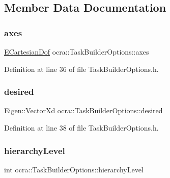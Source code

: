 \subsection{Member Data Documentation}
\hypertarget{classocra_1_1TaskBuilderOptions_ad29bb1310906e4618c8132dd3cea771c}{}\label{classocra_1_1TaskBuilderOptions_ad29bb1310906e4618c8132dd3cea771c} 
\subsubsection{\texorpdfstring{axes}{axes}}
{\footnotesize\ttfamily \hyperlink{namespaceocra_a436781c7059a0f76027df1c652126260}{E\+Cartesian\+Dof} ocra\+::\+Task\+Builder\+Options\+::axes}



Definition at line 36 of file Task\+Builder\+Options.\+h.

\hypertarget{classocra_1_1TaskBuilderOptions_a55e98de13c8eaf3f2ace1778034d1466}{}\label{classocra_1_1TaskBuilderOptions_a55e98de13c8eaf3f2ace1778034d1466} 
\subsubsection{\texorpdfstring{desired}{desired}}
{\footnotesize\ttfamily Eigen\+::\+Vector\+Xd ocra\+::\+Task\+Builder\+Options\+::desired}



Definition at line 38 of file Task\+Builder\+Options.\+h.

\hypertarget{classocra_1_1TaskBuilderOptions_ad32edcc41af7b2aab2d3b66c7f866d75}{}\label{classocra_1_1TaskBuilderOptions_ad32edcc41af7b2aab2d3b66c7f866d75} 
\subsubsection{\texorpdfstring{hierarchy\+Level}{hierarchyLevel}}
{\footnotesize\ttfamily int ocra\+::\+Task\+Builder\+Options\+::hierarchy\+Level}



